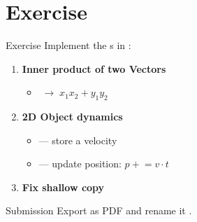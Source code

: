 \section{Exercise}

\begin{frame}{Exercise}
    Implement the s in :

    \begin{enumerate}
        \item \textbf{Inner product of two Vectors}
        \begin{itemize}
            \item {} $\;\to\; x_1 x_2 + y_1 y_2$
        \end{itemize}
        \item \textbf{2D Object dynamics}
        \begin{itemize}
            \item {} --- store a velocity 
            \item {} --- update position: $p \mathrel{+}= v \cdot t$
        \end{itemize}
        \item \textbf{Fix shallow copy}
    \end{enumerate}

    \vspace{0.5em}
    \begin{block}{Submission}
    Export  as PDF and rename it .
    \end{block}
\end{frame}


